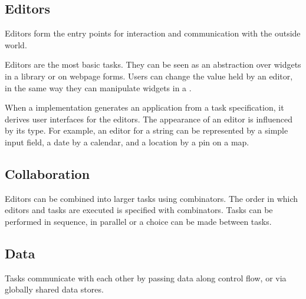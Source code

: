 \subsection{Editors}

Editors form the entry points for interaction and communication with the outside world.

Editors are the most basic tasks.
They can be seen as an abstraction over widgets in a \GUI library or on webpage forms.
Users can change the value held by an editor, in the same way they can manipulate widgets in a \GUI.

When a \TOP implementation generates an application from a task specification, it derives user interfaces for the editors.
The appearance of an editor is influenced by its type.
For example, an editor for a string can be represented by a simple input field, a date by a calendar, and a location by a pin on a map.


\subsection{Collaboration}

Editors can be combined into larger tasks using combinators.
The order in which editors and tasks are executed is specified with combinators. Tasks can be performed in sequence, in parallel or a choice can be made between tasks.


\subsection{Data}

Tasks communicate with each other by passing data along control flow, or via globally shared data stores.





%
%
